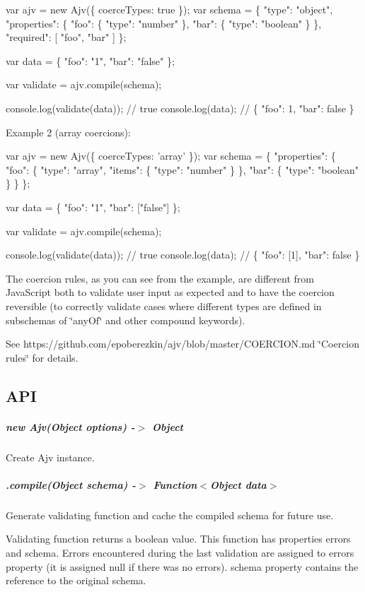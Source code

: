 \begin{DoxyCode}
var ajv = new Ajv(\{ coerceTypes: true \});
var schema = \{
  "type": "object",
  "properties": \{
    "foo": \{ "type": "number" \},
    "bar": \{ "type": "boolean" \}
  \},
  "required": [ "foo", "bar" ]
\};

var data = \{ "foo": "1", "bar": "false" \};

var validate = ajv.compile(schema);

console.log(validate(data)); // true
console.log(data); // \{ "foo": 1, "bar": false \}
\end{DoxyCode}


Example 2 (array coercions)\+:


\begin{DoxyCode}
var ajv = new Ajv(\{ coerceTypes: 'array' \});
var schema = \{
  "properties": \{
    "foo": \{ "type": "array", "items": \{ "type": "number" \} \},
    "bar": \{ "type": "boolean" \}
  \}
\};

var data = \{ "foo": "1", "bar": ["false"] \};

var validate = ajv.compile(schema);

console.log(validate(data)); // true
console.log(data); // \{ "foo": [1], "bar": false \}
\end{DoxyCode}


The coercion rules, as you can see from the example, are different from Java\+Script both to validate user input as expected and to have the coercion reversible (to correctly validate cases where different types are defined in subschemas of \char`\"{}any\+Of\char`\"{} and other compound keywords).

See https\+://github.com/epoberezkin/ajv/blob/master/\+C\+O\+E\+R\+C\+I\+O\+N.\+md \char`\"{}\+Coercion rules\char`\"{} for details.

\subsection*{A\+PI}

\subparagraph*{new Ajv(\+Object options) -\/$>$ Object}

Create Ajv instance.

\subparagraph*{.compile(\+Object schema) -\/$>$ Function$<$Object data$>$}

Generate validating function and cache the compiled schema for future use.

Validating function returns a boolean value. This function has properties {\ttfamily errors} and {\ttfamily schema}. Errors encountered during the last validation are assigned to {\ttfamily errors} property (it is assigned {\ttfamily null} if there was no errors). {\ttfamily schema} property contains the reference to the original schema.

